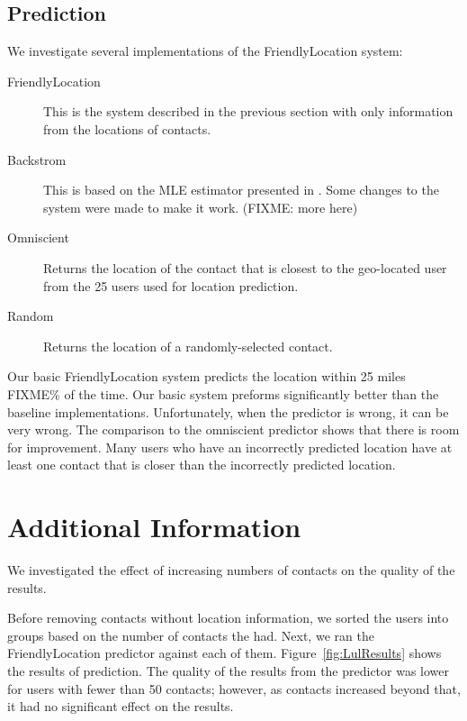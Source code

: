 \subsection{Prediction}
We investigate several implementations of the FriendlyLocation system:
\begin{description}
\item[FriendlyLocation] This is the system described in the previous
    section with only information from the locations of contacts.
\item[Backstrom] This is based on the MLE estimator presented in
    \cite{backstrom2010find}. Some changes to the system were made to make it
    work. (FIXME: more here)
\item[Omniscient] Returns the location of the contact that is closest to the
    geo-located user from the 25 users used for location prediction.
\item[Random] Returns the location of a randomly-selected contact.
\end{description}

Our basic FriendlyLocation system predicts the location within 25 miles FIXME\% of
the time.
%
Our basic system preforms significantly better than the baseline implementations.
%
Unfortunately, when the predictor is wrong, it can be very wrong.
%
The comparison to the omniscient predictor shows that there is room for improvement.
%
Many users who have an incorrectly predicted location have at least one contact
that is closer than the incorrectly predicted location.


\section{Additional Information}
We investigated the effect of increasing numbers of contacts on the quality of
the results.

Before removing contacts without location information, we sorted the users into
groups based on the number of contacts the had.
Next, we ran the FriendlyLocation predictor against each of them.
Figure~\ref{fig:LulResults} shows the results of prediction.
The quality of the results from the predictor was lower for users with fewer
than 50 contacts; however, as contacts increased beyond that, it had no
significant effect on the results.

